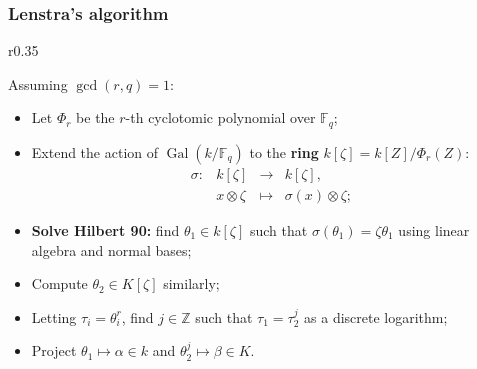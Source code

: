 \documentclass[francais]{beamer}
\def\Z {\ensuremath{\mathbb{Z}}}
\def\F {\ensuremath{\mathbb{F}}}
\DeclareMathOperator{\Gal}{Gal}
\begin{document}
\begin{frame}\frametitle{Lenstra's algorithm}
  \begin{wrapfigure}[9]{r}{0.35\textwidth}
    \end{wrapfigure}

    Assuming $\gcd(r,q)=1$:
    \begin{itemize}
    \item Let $\Phi_r$ be the $r$-th cyclotomic
      polynomial over $\F_q$;
    \item Extend the action of $\Gal(k/\F_q)$ to the \textbf{ring}
      $k[\zeta]=k[Z]/\Phi_r(Z)$:
      \[\begin{array}{llll}
          \sigma: & k[\zeta] & \rightarrow & k[\zeta], \\
                  & x \otimes \zeta & \mapsto & \sigma(x) \otimes \zeta;
        \end{array}\]
    \end{itemize}

    \begin{itemize}
    \item \textbf{Solve Hilbert 90:} find $\theta_1 \in k[\zeta]$ such that
      $\sigma(\theta_1) = \zeta\theta_1$ using linear algebra and normal bases;
    \item Compute $\theta_2 \in K[\zeta]$ similarly;
    \end{itemize}

    \begin{itemize}
    \item Letting $\tau_i = \theta_i^r$,
      find $j \in \Z$ such that $\tau_1 = \tau_2^j$ as a discrete logarithm;
    \item Project $\theta_1\mapsto\alpha\in k$ and
      $\theta_2^j\mapsto\beta\in K$.
    \end{itemize}

\end{frame}
\end{document}
